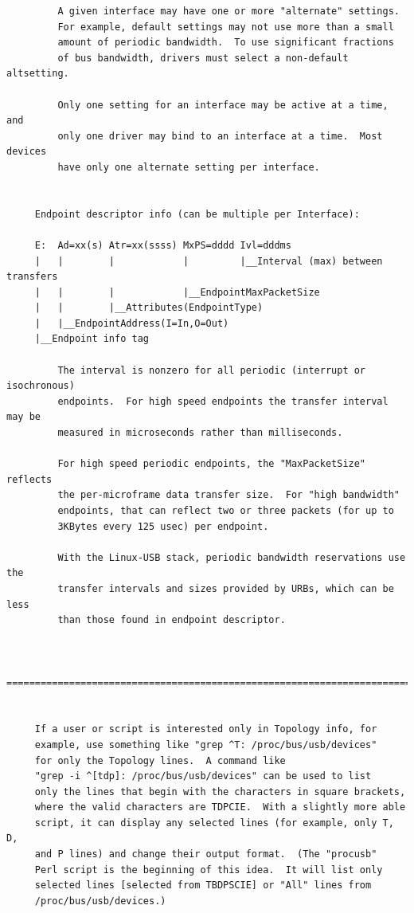 {{{{{{{{{{{{{{{{{\begin{verbatim}
         A given interface may have one or more "alternate" settings.
         For example, default settings may not use more than a small
         amount of periodic bandwidth.  To use significant fractions
         of bus bandwidth, drivers must select a non-default altsetting.
     
         Only one setting for an interface may be active at a time, and
         only one driver may bind to an interface at a time.  Most devices
         have only one alternate setting per interface.
     
     
     Endpoint descriptor info (can be multiple per Interface):
     
     E:  Ad=xx(s) Atr=xx(ssss) MxPS=dddd Ivl=dddms
     |   |        |            |         |__Interval (max) between transfers
     |   |        |            |__EndpointMaxPacketSize
     |   |        |__Attributes(EndpointType)
     |   |__EndpointAddress(I=In,O=Out)
     |__Endpoint info tag
     
         The interval is nonzero for all periodic (interrupt or isochronous)
         endpoints.  For high speed endpoints the transfer interval may be
         measured in microseconds rather than milliseconds.
     
         For high speed periodic endpoints, the "MaxPacketSize" reflects
         the per-microframe data transfer size.  For "high bandwidth"
         endpoints, that can reflect two or three packets (for up to
         3KBytes every 125 usec) per endpoint.
     
         With the Linux-USB stack, periodic bandwidth reservations use the
         transfer intervals and sizes provided by URBs, which can be less
         than those found in endpoint descriptor.
     
     
     =======================================================================
     
     
     If a user or script is interested only in Topology info, for
     example, use something like "grep ^T: /proc/bus/usb/devices"
     for only the Topology lines.  A command like
     "grep -i ^[tdp]: /proc/bus/usb/devices" can be used to list
     only the lines that begin with the characters in square brackets,
     where the valid characters are TDPCIE.  With a slightly more able
     script, it can display any selected lines (for example, only T, D,
     and P lines) and change their output format.  (The "procusb"
     Perl script is the beginning of this idea.  It will list only
     selected lines [selected from TBDPSCIE] or "All" lines from
     /proc/bus/usb/devices.)
     

\end{verbatim}}}}}}}}}}}}}}}}}}
